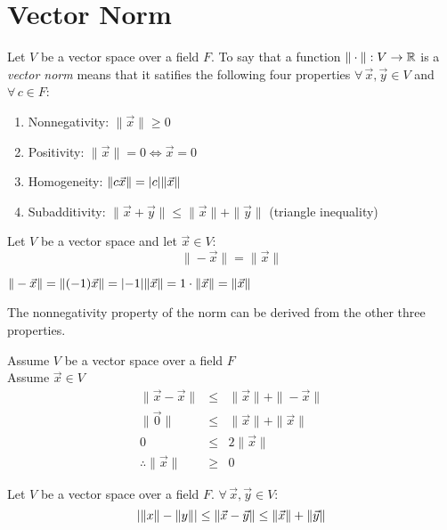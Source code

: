 \documentclass[letterpaper,12pt,fleqn]{article}
\newcommand{\vx}{\vec{x}}
\newcommand{\vy}{\vec{y}}
\newcommand{\vz}{\vec{0}}
\newcommand{\norm}[1]{\|#1\|}
\begin{document}
\section*{Vector Norm}

\begin{definition}
  Let $V$ be a vector space over a field $F$. To say that a function
  $\norm{\cdot}:V\to\R$ is a \emph{vector norm} means that it satifies the
  following four properties $\forall\,\vx,\vy\in V$ and $\forall\,c\in F$:
  \begin{enumerate}
  \item Nonnegativity: $\norm{\vx}\ge0$
  \item Positivity: $\norm{\vx}=0\iff\vx=0$
  \item Homogeneity: $\norm{c\vx}=\abs{c}\norm{\vx}$
  \item Subadditivity: $\norm{\vx+\vy}\le\norm{\vx}+\norm{\vy}$
    (triangle inequality)
  \end{enumerate}
\end{definition}

\begin{theorem}
  Let $V$ be a vector space and let $\vx\in V$:
  \[\norm{-\vx}=\norm{\vx}\]
\end{theorem}

\begin{theproof}
  $\norm{-\vx}=\norm{(-1)\vx}=\abs{-1}\norm{\vx}=1\cdot\norm{\vx}=\norm{\vx}$
\end{theproof}

\begin{theorem}
  The nonnegativity property of the norm can be derived from the other three
  properties.
\end{theorem}

\begin{theproof}
  Assume $V$ be a vector space over a field $F$ \\
  Assume $\vx\in V$
  \begin{eqnarray*}
    \norm{\vx-\vx} &\le& \norm{\vx}+\norm{-\vx} \\
    \norm{\vz} &\le& \norm{\vx}+\norm{\vx} \\
    0 &\le& 2\norm{\vx} \\
    \therefore\norm{\vx} &\ge& 0
  \end{eqnarray*}
\end{theproof}

\begin{theorem}
  Let $V$ be a vector space over a field $F$. $\forall\,\vx,\vy\in V$:
  \[\abs{\norm{x}-\norm{y}}\le\norm{\vx-\vy}\le\norm{\vx}+\norm{\vy}\]
\end{theorem}
\end{document}
